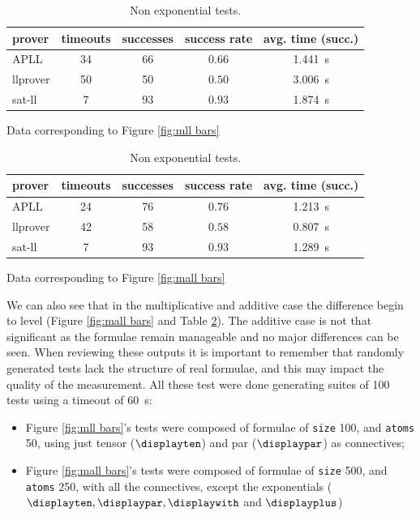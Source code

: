 \begin{table}[h!]
	\begin{subtable}{\textwidth}
		\centering
		{\footnotesize
		\begin{tabular}{| l c c c c | }
			\hline
			\textbf{prover} & \textbf{timeouts} & \textbf{successes} & \textbf{success rate} & \textbf{avg. time (succ.)} \\
			\hline
			\hline
			APLL & 34 & 66 & $0.66$ & \qty{1.441}{\second}  \\
			llprover & 50 & 50 & $0.50$ & \qty{3.006}{\second}  \\
			sat-ll & 7 & 93 & $0.93$ & \qty{1.874}{\second} \\
			\hline
		\end{tabular}
		}
		\caption{Data corresponding to Figure \ref{fig:mll bars}}
		\label{table:mll}
	\end{subtable}\vspace{.5cm}
	\begin{subtable}{\textwidth}
		\centering
		{\footnotesize
		\begin{tabular}{| l c c c c | }
			\hline
			\textbf{prover} & \textbf{timeouts} & \textbf{successes} & \textbf{success rate} & \textbf{avg. time (succ.)} \\
			\hline
			\hline
			APLL & 24 & 76 & $0.76 $ & \qty{1.213}{\second}  \\
			llprover & 42 & 58 & $0.58$ & \qty{0.807}{\second}  \\
			sat-ll & 7 & 93 & $0.93$ & \qty{1.289}{\second} \\
			\hline
		\end{tabular}
		}
		\caption{Data corresponding to Figure \ref{fig:mall bars}}
		\label{table:mall}
	\end{subtable}
	\caption{Non exponential tests.}
\end{table}
We can also see that in the multiplicative and additive case the difference begin to level (Figure \ref{fig:mall bars} and Table \ref{table:mall}).
The additive case is not that significant as the formulae remain manageable and no major differences can be seen.
When reviewing these outputs it is important to remember that randomly generated tests lack the structure of real formulae, and this may impact the quality of the measurement.
All these test were done generating suites of 100 tests using a timeout of \qty{60}{\second}:
\begin{itemize}
	\item Figure \ref{fig:mll bars}'s tests were composed of formulae of \texttt{size} 100, and \texttt{atoms} 50, using just tensor ($\displayten$) and par ($\displaypar$) as connectives;
	\item Figure \ref{fig:mall bars}'s tests were composed of formulae of \texttt{size} 500, and \texttt{atoms} 250, with all the connectives, except the exponentials ($\displayten, \displaypar, \displaywith$ and $\displayplus$)
\end{itemize}

